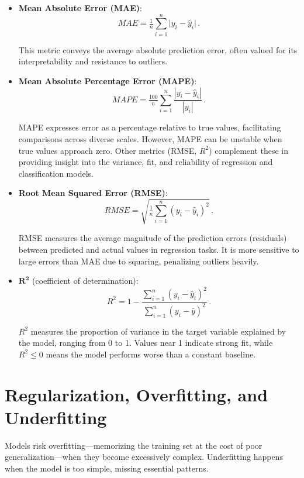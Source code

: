 \begin{itemize}
    \item \textbf{Mean Absolute Error (MAE)}:
        \[
            MAE = \tfrac{1}{n}\sum_{i=1}^n \lvert y_i - \hat{y}_i \rvert \, .
        \]

        This metric conveys the average absolute prediction error, often valued for its interpretability and resistance to outliers.

    \item \textbf{Mean Absolute Percentage Error (MAPE)}:
        \[
            MAPE = \tfrac{100}{n}\sum_{i=1}^n \frac{|y_i - \hat{y}_i|}{|y_i|} \, .
        \]

        MAPE expresses error as a percentage relative to true values, facilitating comparisons across diverse scales. However, MAPE can be unstable when true values approach zero.
        Other metrics (RMSE, $R^2$) complement these in providing insight into the variance, fit, and reliability of regression and classification models.

    \item \textbf{Root Mean Squared Error (RMSE)}:
        \[
            RMSE = \sqrt{\tfrac{1}{n}\sum_{i=1}^n (y_i - \hat{y}_i)^2} \, .
        \]

        RMSE measures the average magnitude of the prediction errors (residuals) between predicted and actual values in regression tasks.
        It is more sensitive to large errors than MAE due to squaring, penalizing outliers heavily.

    \item $\mathbf{R^2}$ (coefficient of determination):
        \[
            R^2 = 1 - \frac{\sum_{i=1}^n (y_i - \hat{y}_i)^2}{\sum_{i=1}^n (y_i - \bar{y})^2} \, .
        \]

        $R^2$ measures the proportion of variance in the target variable explained by the model, ranging from 0 to 1.
        Values near 1 indicate strong fit, while $R^2 \!\leq\! 0$ means the model performs worse than a constant baseline.

\end{itemize}

\section{Regularization, Overfitting, and Underfitting}
Models risk overfitting—memorizing the training set at the cost of poor generalization—when they become excessively complex.
Underfitting happens when the model is too simple, missing essential patterns.

